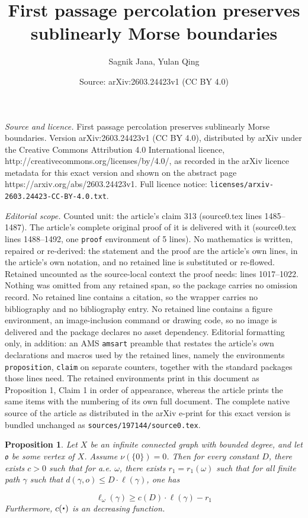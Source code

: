 \documentclass[10pt,a4paper]{amsart}
\title{First passage percolation preserves sublinearly Morse boundaries}
\author{Sagnik Jana, Yulan Qing}
\date{Source: arXiv:2603.24423v1 (CC BY 4.0)}
\newtheorem{proposition}{Proposition}
\newcommand{\go}{{\gothic o}}
\newcommand{\gothic}{\mathfrak}
\newcommand{\param}{{\mathchoice{\mkern1mu\mbox{\raise2.2pt\hbox{$
  \centerdot$}}
  \mkern1mu}{\mkern1mu\mbox{\raise2.2pt\hbox{$\centerdot$}}\mkern1mu}{
  \mkern1.5mu\centerdot\mkern1.5mu}{\mkern1.5mu\centerdot\mkern1.5mu}}}
\begin{document}
\maketitle

\noindent\emph{Source and licence.} First passage percolation preserves sublinearly Morse boundaries. Version arXiv:2603.24423v1 (CC BY 4.0), distributed by arXiv under the Creative Commons Attribution 4.0 International licence, http://creativecommons.org/licenses/by/4.0/, as recorded in the arXiv licence metadata for this exact version and shown on the abstract page https://arxiv.org/abs/2603.24423v1. Full licence notice: \texttt{licenses/arxiv-2603.24423-CC-BY-4.0.txt}.\par\smallskip

\noindent\textit{Editorial scope.} Counted unit: the article's claim 313 (source0.tex lines 1485--1487). The article's complete original proof of it is delivered with it (source0.tex lines 1488--1492, one \texttt{proof} environment of 5 lines). No mathematics is written, repaired or re-derived: the statement and the proof are the article's own lines, in the article's own notation, and no retained line is substituted or re-flowed.  Retained uncounted as the source-local context the proof needs: lines 1017--1022.  Nothing was omitted from any retained span, so the package carries no omission record.  No retained line contains a citation, so the wrapper carries no bibliography and no bibliography entry.  No retained line contains a figure environment, an image-inclusion command or drawing code, so no image is delivered and the package declares no asset dependency.  Editorial formatting only, in addition: an AMS \texttt{amsart} preamble that restates the article's own declarations and macros used by the retained lines, namely the environments \texttt{proposition}, \texttt{claim} on separate counters, together with the standard packages those lines need.  The retained environments print in this document as Proposition 1, Claim 1 in order of appearance, whereas the article prints the same items with the numbering of its own full document.  The complete native source of the article as distributed in the arXiv e-print for this exact version is bundled unchanged as \texttt{sources/197144/source0.tex}.
\begin{proposition}\label{extension}\label{BT2}
 Let $X$ be an infinite connected graph with bounded degree, and let $\go$ be some vertex of $X$. Assume $\nu(\{0\})=0$. Then for every constant $D$, there exists $c>0$ such that for a.e. $\omega$, there exists $r_{1}=r_{1}(\omega)$ such that for all finite path $\gamma$ such that $d(\gamma, o) \leq D \cdot \ell(\gamma)$, one has

\[ \ell_\omega(\gamma)\geq c(D) \cdot \ell(\gamma)-r_{1}\]
Furthermore, $c(\param)$ is an decreasing function.
\end{proposition}
\end{document}

